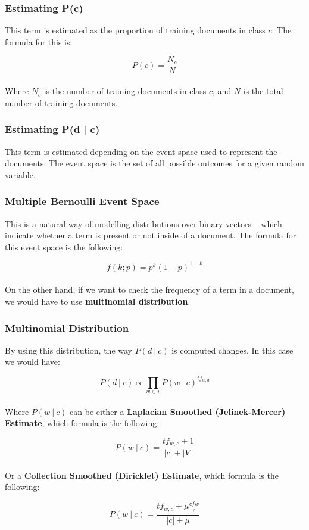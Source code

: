 \documentclass{article}
\begin{document}
\subsubsection{Estimating P(c)}
This term is estimated as the proportion of training documents in class $c$. The formula for this is:

\[ P(c) = \frac{N_c}{N} \] \\
Where $N_c$ is the number of training documents in class $c$, and $N$ is the total number of training documents.

\subsubsection{Estimating P(d $|$ c)}
This term is estimated depending on the event space used to represent the documents. The event space is the set of all possible outcomes for a given random variable.

\subsubsection{Multiple Bernoulli Event Space}
This is a natural way of modelling distributions over binary vectors -- which indicate whether a term is present or not inside of a document. The formula for this event space is the following:

\[ f(k;p) = p^k(1-p)^{1-k} \] \\
On the other hand, if we want to check the frequency of a term in a document, we would have to use \textbf{multinomial distribution}.

\subsubsection{Multinomial Distribution}
By using this distribution, the way $P(d~|~c)$ is computed changes, In this case we would have:

\[ P(d~|~c) \propto \prod_{w \in v} P(w~|~c)^{tf_{w,d}} \] \\
Where $P(w~|~c)$ can be either a \textbf{Laplacian Smoothed (Jelinek-Mercer) Estimate}, which formula is the following:

\[ P(w~|~c) = \frac{tf_{w,c} + 1}{|c| + |V|} \] \\
Or a \textbf{Collection Smoothed (Diricklet) Estimate}, which formula is the following:

\[ P(w~|~c) = \frac{tf_{w,c} + \mu \frac{cfw}{|c|}}{|c| + \mu} \]
\end{document}
